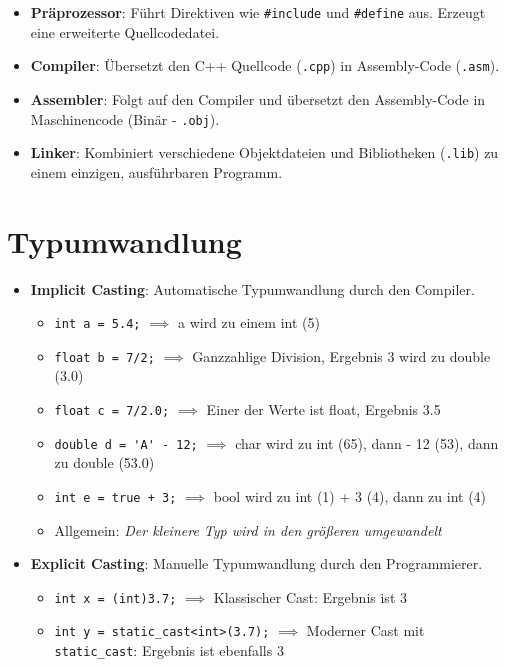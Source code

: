 \documentclass[8pt, landscape]{article}
\newcommand{\datastruct}[1]{\textbf{\textcolor{red!60!black}{#1}}}
\begin{document}
\begin{multicols*}{4}
\begin{itemize}
    \item \datastruct{Präprozessor}: Führt Direktiven wie \lstinline|#include| und \lstinline|#define| aus. Erzeugt eine erweiterte Quellcodedatei.
    
    \item \datastruct{Compiler}: Übersetzt den C++ Quellcode (\lstinline|.cpp|) in Assembly-Code (\lstinline|.asm|).
   
    \item \datastruct{Assembler}: Folgt auf den Compiler und übersetzt den Assembly-Code in Maschinencode (Binär - \lstinline|.obj|).
   
    \item \datastruct{Linker}: Kombiniert verschiedene Objektdateien und Bibliotheken (\lstinline|.lib|) zu einem einzigen, ausführbaren Programm.

\end{itemize}

\section{Typumwandlung}

\begin{itemize}
    \item \datastruct{Implicit Casting}: Automatische Typumwandlung durch den Compiler.
    \begin{itemize}
        \item \lstinline|int a = 5.4;| $\implies$ a wird zu einem int (5)
        \item \lstinline|float b = 7/2;| $\implies$ Ganzzahlige Division, Ergebnis 3 wird zu double (3.0)
        \item \lstinline|float c = 7/2.0;| $\implies$ Einer der Werte ist float, Ergebnis 3.5
        \item \lstinline|double d = 'A' - 12;| $\implies$ char wird zu int (65), dann - 12 (53), dann zu double (53.0)
        \item \lstinline|int e = true + 3;| $\implies$ bool wird zu int (1) + 3 (4), dann zu int (4)
        \item Allgemein: \textit{Der kleinere Typ wird in den größeren umgewandelt}
    \end{itemize}

    \item \datastruct{Explicit Casting}: Manuelle Typumwandlung durch den Programmierer.
    \begin{itemize} 
        \item \lstinline|int x = (int)3.7;| $\implies$ Klassischer Cast: Ergebnis ist 3
        \item \lstinline|int y = static_cast<int>(3.7);| $\implies$ Moderner Cast mit \lstinline|static_cast|: Ergebnis ist ebenfalls 3
    \end{itemize}
\end{itemize}


\end{multicols*}
\end{document}

